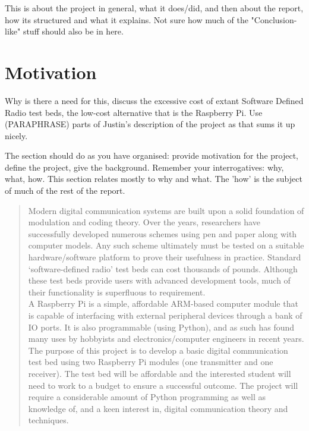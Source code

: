 \documentclass[../main.tex]{subfiles}
\begin{document}
This is about the project in general, what it does/did, and then about the report, how its structured and what it explains. Not sure how much of the "Conclusion-like" stuff should also be in here.



\section{Motivation}

Why is there a need for this, discuss the excessive cost of extant Software Defined Radio test beds, the low-cost alternative that is the Raspberry Pi. Use (PARAPHRASE) parts of Justin's description of the project as that sums it up nicely.

The section should do as you have organised: provide motivation for the project, define the project, give the background.  Remember your interrogatives: why, what, how.  This section relates mostly to why and what.  The 'how' is the subject of much of the rest of the report.

\begin{quotation}
	Modern digital communication systems are built upon a solid foundation of modulation and coding theory.
	Over the years, researchers have successfully developed numerous schemes using pen and paper along with computer models.
	Any such scheme ultimately must be tested on a suitable hardware/software platform to prove their usefulness in practice.
	Standard ‘software-defined radio’ test beds can cost thousands of pounds.
	Although these test beds provide users with advanced development tools, much of their functionality is superfluous to requirement.\\
	
	A Raspberry Pi is a simple, affordable ARM-based computer module that is capable of interfacing with external peripheral devices through a bank of IO ports.
	It is also programmable (using Python), and as such has found many uses by hobbyists and electronics/computer engineers in recent years.
	The purpose of this project is to develop a basic digital communication test bed using two Raspberry Pi modules (one transmitter and one receiver).
	The test bed will be affordable and the interested student will need to work to a budget to ensure a successful outcome.
	The project will require a considerable amount of Python programming as well as knowledge of, and a keen interest in, digital communication theory and techniques.
\end{quotation}
\end{document}
